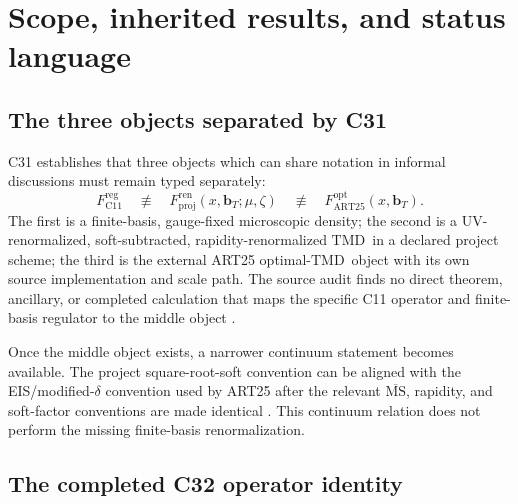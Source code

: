 \documentclass[11pt]{article}
\newcommand{\TMD}{\ensuremath{\mathrm{TMD}}}
\newcommand{\bT}{\bm b_T}
\newcommand{\Proj}{\ensuremath{\mathrm{proj}}}
\newcommand{\ART}{\ensuremath{\mathrm{ART25}}}
\newcommand{\Ren}{\ensuremath{\mathrm{ren}}}
\begin{document}
\begin{abstract}
The volume also defines a tensor-network and future quantum-circuit interface in which the hadronic state network and the vacuum soft/eikonal operator network remain separate computational objects.  It gives machine-readable schemas, 65 stable formal requirements, benchmark and falsification families, a mandatory negative-test catalogue, implementation stages, acceptance criteria, and exact C33/C34 branches.  A rigorous tree-level-only or structural no-go result remains scientifically valid; no missing renormalization ingredient is assigned zero.
\end{abstract}

\tableofcontents
\newpage

\section{Scope, inherited results, and status language}
\label{sec:scope}

\subsection{The three objects separated by C31}

C31 establishes that three objects which can share notation in informal discussions must remain typed separately:
\begin{equation}
 F_{\mathrm{C11}}^{\mathrm{reg}}
 \quad\not\equiv\quad
 F_{\Proj}^{\Ren}(x,\bT;\mu,\zeta)
 \quad\not\equiv\quad
 F_{\ART}^{\mathrm{opt}}(x,\bT).
 \label{eq:three-objects}
\end{equation}
The first is a finite-basis, gauge-fixed microscopic density; the second is a UV-renormalized, soft-subtracted, rapidity-renormalized \TMD\ in a declared project scheme; the third is the external ART25 optimal-\TMD\ object with its own source implementation and scale path.  The source audit finds no direct theorem, ancillary, or completed calculation that maps the specific C11 operator and finite-basis regulator to the middle object \cite{C31Report}.

Once the middle object exists, a narrower continuum statement becomes available.  The project square-root-soft convention can be aligned with the EIS/modified-\(\delta\) convention used by ART25 after the relevant \(\overline{\mathrm{MS}}\), rapidity, and soft-factor conventions are made identical \cite{CollinsRogers2012}.  This continuum relation does not perform the missing finite-basis renormalization.

\subsection{The completed C32 operator identity}
\end{document}
